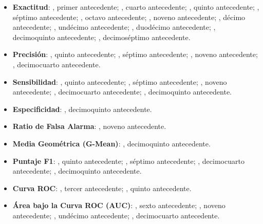 \begin{itemize}
	\item \textbf{Exactitud}: \citeauthor{pr_chen2013kickpredict}, primer antecedente; \citeauthor{pr_chen2015predcrowd}, cuarto antecedente; \citeauthor{pr_beckwith2016predcrowd}, quinto antecedente; \citeauthor{pr_yuan2016textanalytics}, séptimo antecedente; \citeauthor{pr_sawhney2016usingLT}, octavo antecedente; \citeauthor{pr_kaur2017socmedcrowd}, noveno antecedente; \citeauthor{pr_kamath2018suplearn}, décimo antecedente; \citeauthor{pr_yu2018deeplearning}, undécimo antecedente; \citeauthor{pr_lee2018contentDL}, duodécimo antecedente; \citeauthor{pr_chen2019keywords_crowdfunding}, decimoquinto antecedente; \citeauthor{pr_shafqat2019topicpredictions}, decimoséptimo antecedente.
	\item \textbf{Precisión}: \citeauthor{pr_beckwith2016predcrowd}, quinto antecedente; \citeauthor{pr_yuan2016textanalytics}, séptimo antecedente; \citeauthor{pr_kaur2017socmedcrowd}, noveno antecedente; \citeauthor{pr_cheng2019deeplearning}, decimocuarto antecedente.
	\item \textbf{Sensibilidad}: \citeauthor{pr_beckwith2016predcrowd}, quinto antecedente; \citeauthor{pr_yuan2016textanalytics}, séptimo antecedente; \citeauthor{pr_kaur2017socmedcrowd}, noveno antecedente; \citeauthor{pr_cheng2019deeplearning}, decimocuarto antecedente; \citeauthor{pr_chen2019keywords_crowdfunding}, decimoquinto antecedente.
	\item \textbf{Especificidad}: \citeauthor{pr_chen2019keywords_crowdfunding}, decimoquinto antecedente.
	\item \textbf{Ratio de Falsa Alarma}: \citeauthor{pr_kaur2017socmedcrowd}, noveno antecedente.
	\item \textbf{Media Geométrica (G-Mean)}: \citeauthor{pr_chen2019keywords_crowdfunding}, decimoquinto antecedente.
	\item \textbf{Puntaje F1}: \citeauthor{pr_beckwith2016predcrowd}, quinto antecedente; \citeauthor{pr_yuan2016textanalytics}, séptimo antecedente; \citeauthor{pr_cheng2019deeplearning}, decimocuarto antecedente; \citeauthor{pr_chen2019keywords_crowdfunding}, decimoquinto antecedente.
	\item \textbf{Curva ROC}: \citeauthor{pr_zhou2015projectdesc}, tercer antecedente; \citeauthor{pr_beckwith2016predcrowd}, quinto antecedente.
	\item \textbf{Área bajo la Curva ROC (AUC)}: \citeauthor{pr_li2016predcrowd}, sexto antecedente; \citeauthor{pr_kaur2017socmedcrowd}, noveno antecedente; \citeauthor{pr_yu2018deeplearning}, undécimo antecedente; \citeauthor{pr_cheng2019deeplearning}, decimocuarto antecedente.

\end{itemize}
